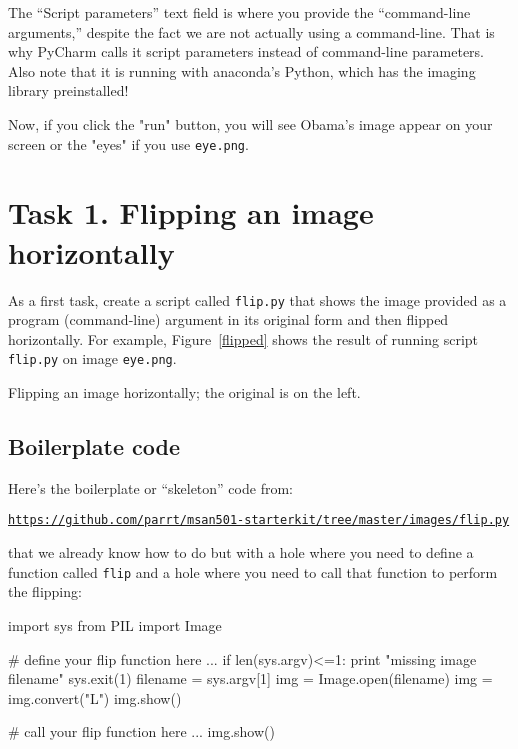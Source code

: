 \documentclass[titlepage]{tufte-book}
\newcommand{\figref}[1]{Figure~\ref{#1}}
\begin{document}

The ``Script parameters'' text field is where you provide the ``command-line arguments,'' despite the fact we are not actually using a command-line. That is why PyCharm calls it script parameters instead of command-line parameters. Also note that it is running with anaconda's Python, which has the imaging library preinstalled!

Now, if you click the "run" button, you will see Obama's image appear on your screen or the "eyes" if you use {\tt eye.png}.

\section{Task 1. Flipping an image horizontally}

As a first task,  create a script called {\tt flip.py} that shows the image provided as a program (command-line) argument in its original form and then flipped horizontally.  For example, \figref{flipped} shows the result of running script {\tt flip.py} on image {\tt eye.png}.

\begin{marginfigure}
\begin{center}
 
\end{center}
\caption{Flipping an image horizontally; the original is on the left.}
\label{flipped}
\end{marginfigure}

\subsection{Boilerplate code}

Here's the boilerplate or ``skeleton'' code from:

\href{https://github.com/parrt/msan501-starterkit/tree/master/images/flip.py}{\tt\small https://github.com/parrt/msan501-starterkit/tree/master/images/flip.py}

\noindent that we already know how to do but with a hole where you need to define a function called {\tt flip} and a hole where you need to call that function to perform the flipping:

\begin{pyverbatim}
import sys
from PIL import Image

# define your flip function here
...
if len(sys.argv)<=1:
	print "missing image filename"
	sys.exit(1)
filename = sys.argv[1]
img = Image.open(filename)
img = img.convert("L")
img.show()

# call your flip function here
...
img.show()
\end{pyverbatim}
\end{document}

